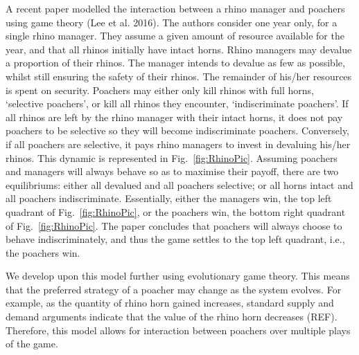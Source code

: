 \documentclass[10pt]{article}
\begin{document}
A recent paper modelled the interaction between a rhino manager and poachers using game theory (Lee et al. 2016). The authors consider one year only, for a single rhino manager. They assume a given amount of resource available for the year, and that all rhinos initially have intact horns. Rhino managers may devalue a proportion of their rhinos. The manager intends to devalue as few as possible, whilst still ensuring the safety of their rhinos. The remainder of his/her resources is spent on security. Poachers may either only kill rhinos with full horns, `selective poachers', or kill all rhinos they encounter, `indiscriminate poachers'. If all rhinos are left by the rhino manager with their intact horns, it does not pay poachers to be selective so they will become indiscriminate poachers.
Conversely, if all poachers are selective, it pays rhino managers to invest in devaluing his/her rhinos. This dynamic is represented in Fig.~\ref{fig:RhinoPic}. Assuming poachers and managers will always behave so as to maximise their payoff, there are two equilibriums: either all devalued and all poachers selective; or all horns intact and all poachers indiscriminate. Essentially, either the managers win, the top left quadrant
of Fig.~\ref{fig:RhinoPic}, or the poachers win, the bottom right quadrant of Fig.~\ref{fig:RhinoPic}. The paper concludes that poachers will always choose to behave indiscriminately, and thus the game settles to the top left quadrant, i.e., the poachers win.

We develop upon this model further using evolutionary game theory. This means that the preferred strategy of a poacher may change as the system evolves. For example, as the quantity of rhino horn gained increases, standard supply and demand arguments indicate that the value of the rhino horn decreases (REF). Therefore, this model allows for interaction between poachers over multiple plays of the game.
\end{document}
